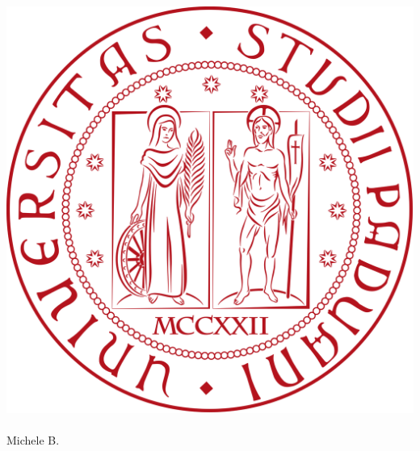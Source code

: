 \thispagestyle{empty}
\renewcommand{\arraystretch}{1.3}

\begin{titlepage}
	\begin{center}
		
	\includegraphics[scale = 0.10]{../template/images/logoUnipd.png}
	\\[2.5cm]
	\Huge \textbf{\doctitle} \\[1cm]
    Michele B.
	\end{center}
\end{titlepage}